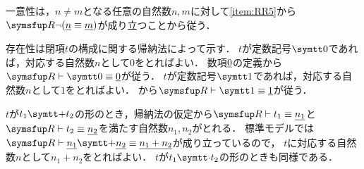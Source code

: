 一意性は，\(n \neq m\)となる任意の自然数\(n, m\)に対して\cref{item:RR5}から\(\RArithmetic \lnot \paren{\numeral{n} \objeq \numeral{m}}\)が成り立つことから従う．

存在性は閉項\(t\)の構成に関する帰納法によって示す．
\(t\)が定数記号\(\obj{0}\)であれば，対応する自然数\(n\)として\(0\)をとればよい．
数項\(\underline{0}\)の定義から\(\RArithmetic \provable \obj{0} \objeq \numeral{0}\)が従う．
\(t\)が定数記号\(\obj{1}\)であれば，対応する自然数\(n\)として\(1\)をとればよい．
から\(\RArithmetic \provable \obj{1} \objeq \numeral{1}\)が従う．

\(t\)が\(t_1 \obj{+} t_2\)の形のとき，帰納法の仮定から\(\RArithmetic \provable t_1 \objeq \numeral{n_1}\)と
\(\RArithmetic \provable t_2 \objeq \numeral{n_2}\)を満たす自然数\(n_1, n_2\)がとれる．
標準モデルでは\(\RArithmetic \provable \numeral{n_1} \obj{+} \numeral{n_2} \objeq \numeral{n_1 + n_2}\)が成り立っているので，
\(t\)に対応する自然数\(n\)として\(n_1 + n_2\)をとればよい．
\(t\)が\(t_1 \obj{\cdot} t_2\)の形のときも同様である．